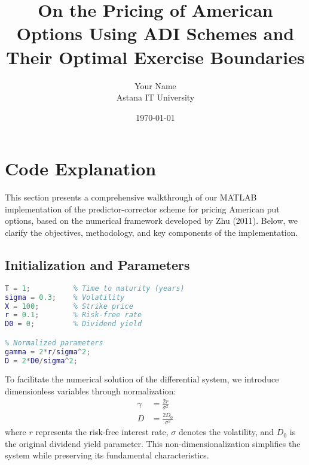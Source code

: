 \documentclass[12pt]{article}
\title{On the Pricing of American Options Using ADI Schemes and Their Optimal Exercise Boundaries}
\author{Your Name \\ Astana IT University}
\date{\today}
\begin{document}
\section{Code Explanation}
\label{sec:code}

This section presents a comprehensive walkthrough of our MATLAB implementation of the predictor-corrector scheme for pricing American put options, based on the numerical framework developed by Zhu (2011). Below, we clarify the objectives, methodology, and key components of the implementation.

\subsection{Initialization and Parameters}
\label{subsec:init}

\begin{lstlisting}[language=Matlab,caption={Parameter setup},label=code:params]
T = 1;          % Time to maturity (years)
sigma = 0.3;    % Volatility
X = 100;        % Strike price
r = 0.1;        % Risk-free rate
D0 = 0;         % Dividend yield

% Normalized parameters
gamma = 2*r/sigma^2;
D = 2*D0/sigma^2;
\end{lstlisting}
To facilitate the numerical solution of the differential system, we introduce dimensionless variables through normalization:
    \begin{align*}
        \gamma &= \frac{2r}{\sigma^2} \\
        D &= \frac{2D_0}{\sigma^2}
    \end{align*}
where $r$ represents the risk-free interest rate, $\sigma$ denotes the volatility, and $D_0$ is the original dividend yield parameter. This non-dimensionalization simplifies the system while preserving its fundamental characteristics.
\end{document}
